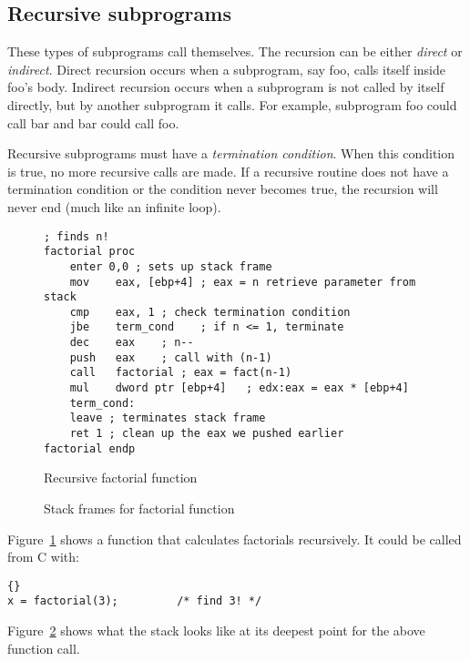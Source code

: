 \subsection{Recursive subprograms}

These types of subprograms call themselves. The recursion can be either
\emph{direct} or \emph{indirect}. Direct recursion occurs when a subprogram,
say {\code foo}, calls itself inside {\code foo}'s body. Indirect recursion
occurs when a subprogram is not called by itself directly, but by another
subprogram it calls. For example, subprogram {\code foo} could call
{\code bar} and {\code bar} could call {\code foo}.

Recursive subprograms must have a \emph{termination condition}. When
this condition is true, no more recursive calls are made. If a
recursive routine does not have a termination condition or the condition
never becomes true, the recursion will never end (much like an infinite
loop).

\begin{figure}
 \begin{lstlisting}[language={[x86masm]Assembler}]
; finds n!
factorial proc
    enter 0,0 ; sets up stack frame
    mov    eax, [ebp+4] ; eax = n retrieve parameter from stack
    cmp    eax, 1 ; check termination condition
    jbe    term_cond    ; if n <= 1, terminate
    dec    eax    ; n--
    push   eax    ; call with (n-1)
    call   factorial ; eax = fact(n-1)
    mul    dword ptr [ebp+4]   ; edx:eax = eax * [ebp+4]
    term_cond:
    leave ; terminates stack frame
    ret 1 ; clean up the eax we pushed earlier
factorial endp
\end{lstlisting}
\caption{Recursive factorial function\label{fig:factorial}}
\end{figure}

\begin{figure}
\centering

\caption{Stack frames for factorial function\label{fig:factStack}}
\end{figure}

Figure~\ref{fig:factorial} shows a function that calculates factorials
recursively. It could be called from C with:
\begin{lstlisting}[stepnumber=0]{}
x = factorial(3);         /* find 3! */
\end{lstlisting}
Figure~\ref{fig:factStack} shows what the stack looks like at its deepest
point for the above function call.



